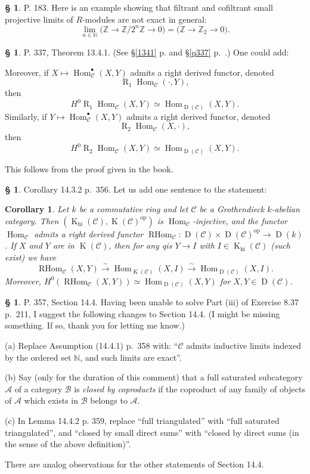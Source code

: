 \documentclass[12pt]{article}
\newtheorem{cor}[thm]{Corollary}
\theoremstyle{remark}
\theoremstyle{definition}
\newtheorem{s}[thm]{\S}
\newcommand{\bu}{\bullet}
\newcommand{\bb}{\mathbb}
\newcommand{\A}{\mathcal A}
\newcommand{\B}{\mathcal B}
\newcommand{\C}{\mathcal C}
\newcommand{\oo}{\operatorname}
\newcommand{\xr}{\xrightarrow}
\DeclareMathOperator{\Hom}{Hom}%
\DeclareMathOperator{\op}{op}
\begin{document}
%
%
\begin{s}
P. 183. Here is an example showing that filtrant and cofiltrant small projective limits of $R$-modules are not exact in general: 
$$
\lim_{n\in\bb N}\big(\bb Z\to\bb Z/2^n\bb Z\to0\big)=\big(\bb Z\to\bb Z_2\to0\big).
$$
\end{s}
%
%
\begin{s}%
P. 337, Theorem 13.4.1. (See \S\ref{1341} p. \pageref{1341} and \S\ref{q337} p.~\pageref{q337}.) One could add:

Moreover, if $X\mapsto\Hom_\C^\bu(X,Y)$ admits a right derived functor, denoted 
$$
\oo R_1\Hom_\C(\cdot,Y),
$$ 
then 
$$
H^0\oo R_1\Hom_\C(X,Y)\simeq\Hom_{\oo D(\C)}(X,Y).
$$ 
Similarly, if $Y\mapsto\Hom_\C^\bu(X,Y)$ admits a right derived functor, denoted 
$$
\oo R_2\Hom_\C(X,\cdot),
$$ 
then 
$$
H^0\oo R_2\Hom_\C(X,Y)\simeq\Hom_{\oo D(\C)}(X,Y).
$$

This follows from the proof given in the book. 
\end{s}
%
%
\begin{s}
Corollary 14.3.2 p.~356. Let us add one sentence to the statement:
%
\begin{cor}\label{1432}
Let $k$ be a commutative ring and let $\C$ be a Grothendieck $k$-abelian category. Then $(\oo K_{\oo{hi}}(\C),\oo K(\C)^{\op})$ is $\Hom_\C$-injective, and the functor $\Hom_\C$ admits a right derived functor $\oo{RHom}_\C:\oo D(\C)\times\oo D(\C)^{\op}\to\oo D(k)$. If $X$ and $Y$ are in $\oo K(\C)$, then for any qis $Y\to I$ with $I\in\oo K_{\oo{hi}}(\C)$ (such exist) we have 
$$
\oo{RHom}_\C(X,Y)\xr\sim\Hom_{\oo K(\C)}(X,I)\xr\sim\Hom_{\oo D(\C)}(X,I).
$$ 
Moreover, $H^0(\oo{RHom}_\C(X,Y))\simeq\Hom_{\oo D(\C)}(X,Y)$ for $X,Y\in\oo D(\C)$.
\end{cor}
\end{s} 
%
%
\begin{s}
P. 357, Section 14.4. Having been unable to solve Part (iii) of Exercise 8.37 p.~211, I suggest the following changes to Section 14.4. (I might be missing something. If so, thank you for letting me know.)

\noindent(a) Replace Assumption (14.4.1) p.~358 with: ``$\C$ admits inductive limits indexed by the ordered set $\bb N$, and such limits are exact''.

\noindent(b) Say (only for the duration of this comment) that a full saturated subcategory $\A$ of a category $\B$ is {\em closed by coproducts} if the coproduct of any family of objects of $\A$ which exists in $\B$ belongs to $\A$.

\noindent(c) In Lemma 14.4.2 p. 359, replace ``full triangulated'' with ``full saturated triangulated'', and ``closed by small direct sums'' with ``closed by direct sums (in the sense of the above definition)''. 

There are analog observations for the other statements of Section 14.4.
\end{s}
\end{document}

